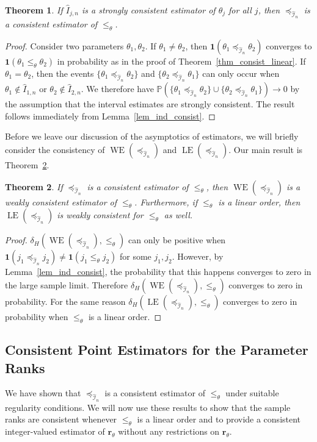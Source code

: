 \documentclass[12pt]{article}
\newcommand{\prob}[1]{\mathbb{P}(#1)}
\newcommand{\ind}[1]{\mathbf{1}(#1)}
\newcommand{\pord}{{\leqslant_{\theta}}}
\newcommand{\iordn}{{\preceq_{\hat{\mathcal{I}}_{n}}}}
\newcommand{\rankp}{{\mathbf{r}_\theta}}
\newcommand{\LE}[1]{\operatorname{LE}(#1)}
\newcommand{\WE}[1]{\operatorname{WE}(#1)}
\newtheorem{theorem}{Theorem}
\numberwithin{theorem}{section}
\begin{document}
\begin{theorem}
\label{thm_consist_weak}
If $\hat{I}_{j, n}$ is a strongly consistent estimator of $\theta_j$ for all $j$, then $\iordn$ is a consistent estimator of $\pord$.
\end{theorem}
\begin{proof}
Consider two parameters $\theta_1, \theta_2$.  If $\theta_1 \neq \theta_2$, then $\ind{\theta_1 \iordn \theta_2}$ converges to $\ind{\theta_1 \pord \theta_2}$ in probability as in the proof of Theorem~\ref{thm_consist_linear}.  If $\theta_1 = \theta_2$, then the events $\{\theta_1 \iordn \theta_2\}$ and $\{\theta_2 \iordn \theta_1\}$ can only occur when $\theta_1 \notin \hat{I}_{1, n}$ or $\theta_2 \notin \hat{I}_{2, n}$.  We therefore have $\prob{\{\theta_1 \iordn \theta_2\} \cup \{\theta_2 \iordn \theta_1\}} \rightarrow 0$ by the assumption that the interval estimates are strongly consistent.  The result follows immediately from Lemma~\ref{lem_ind_consist}.
\end{proof}

Before we leave our discussion of the asymptotics of estimators, we will briefly consider the consistency of $\WE{\iordn}$ and $\LE{\iordn}$.  Our main result is Theorem~\ref{thm_consist_conf_set}.

\begin{theorem}
\label{thm_consist_conf_set}
If $\iordn$ is a consistent estimator of $\pord$, then $\WE{\iordn}$ is a weakly consistent estimator of $\pord$.  Furthermore, if $\pord$ is a linear order, then $\LE{\iordn}$ is weakly consistent for $\pord$ as well.
\end{theorem}
\begin{proof}
$\delta_H(\WE{\iordn}, \pord)$ can only be positive when $\ind{j_1 \iordn j_2} \neq \ind{j_1 \pord j_2}$ for some $j_1, j_2$.  However, by Lemma~\ref{lem_ind_consist}, the probability that this happens converges to zero in the large sample limit.  Therefore $\delta_H(\WE{\iordn}, \pord)$ converges to zero in probability.  For the same reason $\delta_H(\LE{\iordn}, \pord)$ converges to zero in probability when $\pord$ is a linear order.
\end{proof}

\subsection{Consistent Point Estimators for the Parameter Ranks}
\label{subsec_point_consist}

We have shown that $\iordn$ is a consistent estimator of $\pord$ under suitable regularity conditions.  We will now use these results to show that the sample ranks are consistent whenever $\pord$ is a linear order and to provide a consistent integer-valued estimator of $\rankp$ without any restrictions on $\rankp$.
\end{document}
